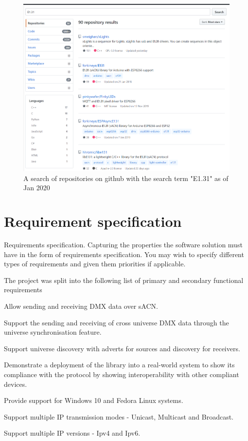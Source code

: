 \documentclass[11pt,a4paper]{article}
\begin{document}
\begin{figure}
	\label{E131_REPO_SEARCH}
	\includegraphics[width=\textwidth]{E131-Repo-Search}
	\caption{A search of repositories on github with the search term "E1.31" as of Jan 2020}
\end{figure}

\section{Requirement specification}
Requirements specification. Capturing the properties the software solution must
have in the form of requirements specification. You
may wish to specify different types of requirements and
given them priorities if applicable.

The project was split into the following list of primary and secondary functional requirements\\
\begin{list}{}{Primary}
	\item Allow sending and receiving DMX data over sACN.
	\item Support the sending and receiving of cross universe DMX data through the universe synchronisation feature.
	\item Support universe discovery with adverts for sources and discovery for receivers.
\end{list}
\begin{list}{}{Secondary}
	\item Demonstrate a deployment of the library into a real-world system to show its compliance with the protocol by showing interoperability with other compliant devices.
	\item Provide support for Windows 10 and Fedora Linux systems.
	\item Support multiple IP transmission modes - Unicast, Multicast and Broadcast.
	\item Support multiple IP versions - Ipv4 and Ipv6.
\end{list}
\end{document}
